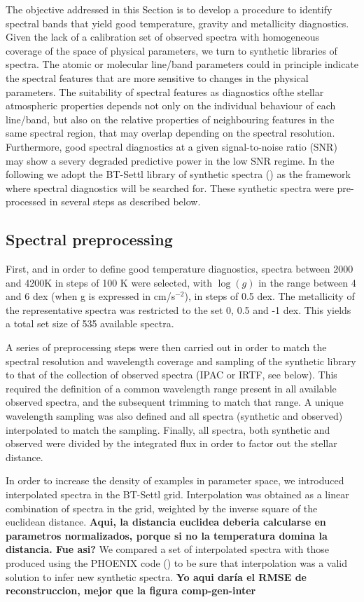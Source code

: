 The objective addressed in this Section is to develop a procedure to
identify spectral bands that yield good temperature, gravity and
metallicity diagnostics. Given the lack of a calibration set of
observed spectra with homogeneous coverage of the space of physical
parameters, we turn to synthetic libraries of spectra. The atomic or
molecular line/band parameters could in principle indicate the
spectral features that are more sensitive to changes in the physical
parameters. The suitability of spectral features as diagnostics ofthe
stellar atmospheric properties depends not only on the individual
behaviour of each line/band, but also on the relative properties of
neighbouring features in the same spectral region, that may overlap
depending on the spectral resolution. Furthermore, good spectral
diagnostics at a given signal-to-noise ratio (SNR) may show a severy
degraded predictive power in the low SNR regime. In the following we
adopt the BT-Settl library of synthetic spectra
(\cite{2013MSAIS..24..128A}) as the framework where spectral
diagnostics will be searched for. These synthetic spectra were
pre-processed in several steps as described below.

\subsection{Spectral preprocessing}

First, and in order to define good temperature diagnostics, spectra
between 2000 and 4200K in steps of 100 K were selected, with $\log(g)$
in the range between 4 and 6 dex (when g is expressed in cm/s$^{-2}$),
in steps of 0.5 dex. The metallicity of the representative spectra was
restricted to the set 0, 0.5 and -1 dex.  This yields a total set size
of 535 available spectra.

A series of preprocessing steps were then carried out in order to
match the spectral resolution and wavelength coverage and sampling of
the synthetic library to that of the collection of observed spectra
(IPAC or IRTF, see below). This required the definition of a common
wavelength range present in all available observed spectra, and the
subsequent trimming to match that range. A unique wavelength sampling
was also defined and all spectra (synthetic and observed) interpolated
to match the sampling. Finally, all spectra, both synthetic and
observed were divided by the integrated flux in order to factor out
the stellar distance.

In order to increase the density of examples in parameter space, we
introduced interpolated spectra in the BT-Settl grid. Interpolation
was obtained as a linear combination of spectra in the grid, weighted
by the inverse square of the euclidean distance. {\bf Aqui, la
distancia euclidea deberia calcularse en parametros normalizados,
porque si no la temperatura domina la distancia. Fue asi?} We compared
a set of interpolated spectra with those produced using the PHOENIX
code (\cite{fuhrmeister2005phoenix}) to be sure that interpolation was
a valid solution to infer new synthetic spectra. {\bf Yo aqui daría el
RMSE de reconstruccion, mejor que la figura comp-gen-inter}

